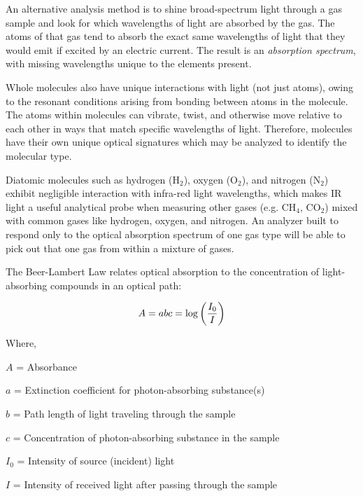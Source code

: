 \vskip 10pt

An alternative analysis method is to shine broad-spectrum light through a gas sample and look for which wavelengths of light are absorbed by the gas.  The atoms of that gas tend to absorb the exact same wavelengths of light that they would emit if excited by an electric current.  The result is an {\it absorption spectrum}, with missing wavelengths unique to the elements present.

\vskip 10pt

Whole molecules also have unique interactions with light (not just atoms), owing to the resonant conditions arising from bonding between atoms in the molecule.  The atoms within molecules can vibrate, twist, and otherwise move relative to each other in ways that match specific wavelengths of light.  Therefore, molecules have their own unique optical signatures which may be analyzed to identify the molecular type.

Diatomic molecules such as hydrogen (H$_{2}$), oxygen (O$_{2}$), and nitrogen (N$_{2}$) exhibit negligible interaction with infra-red light wavelengths, which makes IR light a useful analytical probe when measuring other gases (e.g. CH$_{4}$, CO$_{2}$) mixed with common gases like hydrogen, oxygen, and nitrogen.  An analyzer built to respond only to the optical absorption spectrum of one gas type will be able to pick out that one gas from within a mixture of gases.

\vskip 10pt

The Beer-Lambert Law relates optical absorption to the concentration of light-absorbing compounds in an optical path:

$$A = abc = \log \left({I_0 \over I}\right)$$

\noindent
Where,

$A$ = Absorbance

$a$ = Extinction coefficient for photon-absorbing substance(s) 

$b$ = Path length of light traveling through the sample

$c$ = Concentration of photon-absorbing substance in the sample 

$I_0$ = Intensity of source (incident) light

$I$ = Intensity of received light after passing through the sample

\vskip 10pt






\filbreak

